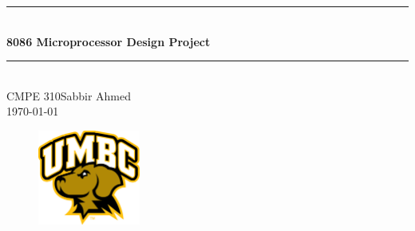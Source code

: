 \begin{titlepage}

    \newcommand{\HRule}{\rule{\linewidth}{0.5mm}}
    \center

    \HRule \\[0.5cm]
    {\huge \bfseries 8086 Microprocessor Design Project}\\[0.4cm]
    \HRule \\[1.5cm]

    \large{CMPE 310\linebreak Sabbir Ahmed}\\[3cm]

    {\large \today}\\[2cm]

    \begin{figure}[h]
        \begin{center}
            \includegraphics[width=0.3\textwidth]{figures/uni_logo.jpg}
            \label{fig:uni_logo}
        \end{center}
    \end{figure}

    \vfill %

\end{titlepage}
